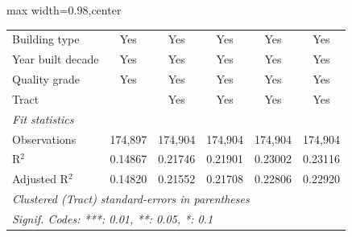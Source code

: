 \begin{table}[htbp]
\begin{adjustbox}{max width=0.98\textwidth,center}
\begin{tabular}{lccccc}
         Building type                           & Yes            & Yes            & Yes            & Yes             & Yes\\  
         Year built decade                       & Yes            & Yes            & Yes            & Yes             & Yes\\  
         Quality grade                           & Yes            & Yes            & Yes            & Yes             & Yes\\  
         Tract                                   &                & Yes            & Yes            & Yes             & Yes\\  
         \midrule
         \emph{Fit statistics}\\
         Observations                            & 174,897        & 174,904        & 174,904        & 174,904         & 174,904\\  
         R$^2$                                   & 0.14867        & 0.21746        & 0.21901        & 0.23002         & 0.23116\\  
         Adjusted R$^2$                          & 0.14820        & 0.21552        & 0.21708        & 0.22806         & 0.22920\\  
         \midrule \midrule
         \multicolumn{6}{l}{\emph{Clustered (Tract) standard-errors in parentheses}}\\
         \multicolumn{6}{l}{\emph{Signif. Codes: ***: 0.01, **: 0.05, *: 0.1}}\\
      \end{tabular}
   \end{adjustbox}
\end{table}


